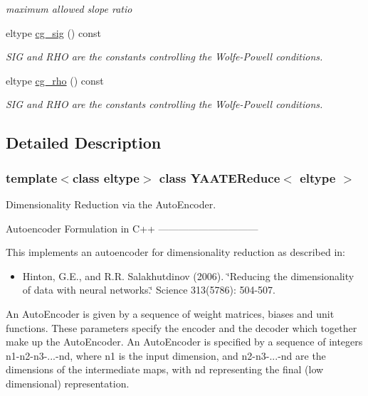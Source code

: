 \begin{CompactItemize}
\begin{CompactList}\small\item\em maximum allowed slope ratio \item\end{CompactList}\item 
eltype \hyperlink{class_y_a_a_t_e_reduce_a38}{cg\_\-sig} () const 
\begin{CompactList}\small\item\em SIG and RHO are the constants controlling the Wolfe-Powell conditions. \item\end{CompactList}\item 
eltype \hyperlink{class_y_a_a_t_e_reduce_a39}{cg\_\-rho} () const 
\begin{CompactList}\small\item\em SIG and RHO are the constants controlling the Wolfe-Powell conditions. \item\end{CompactList}\end{CompactItemize}


\subsection{Detailed Description}
\subsubsection*{template$<$class eltype$>$ class YAATEReduce$<$ eltype $>$}

Dimensionality Reduction via the Auto\-Encoder. 

Autoencoder Formulation in C++ ------------------------------

This implements an autoencoder for dimensionality reduction as described in:

\begin{itemize}
\item Hinton, G.E., and R.R. Salakhutdinov (2006). \char`\"{}Reducing the dimensionality of data with neural networks.\char`\"{} Science 313(5786): 504-507.\end{itemize}


An Auto\-Encoder is given by a sequence of weight matrices, biases and unit functions. These parameters specify the encoder and the decoder which together make up the Auto\-Encoder. An Auto\-Encoder is specified by a sequence of integers n1-n2-n3-...-nd, where n1 is the input dimension, and n2-n3-...-nd are the dimensions of the intermediate maps, with nd representing the final (low dimensional) representation.

